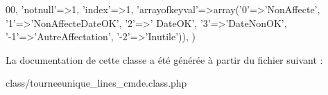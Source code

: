 \begin{DoxyCode}
      00, \textcolor{stringliteral}{'notnull'}=>1, \textcolor{stringliteral}{'index'}=>1, \textcolor{stringliteral}{'arrayofkeyval'}=>array(\textcolor{charliteral}{'0'}=>\textcolor{stringliteral}{'NonAffecte'}, \textcolor{charliteral}{'1'}=>\textcolor{stringliteral}{'NonAffecteDateOK'}, \textcolor{charliteral}{'2'}=>\textcolor{stringliteral}{'
      DateOK'}, \textcolor{charliteral}{'3'}=>\textcolor{stringliteral}{'DateNonOK'},  \textcolor{stringliteral}{'-1'}=>\textcolor{stringliteral}{'AutreAffectation'}, \textcolor{stringliteral}{'-2'}=>\textcolor{stringliteral}{'Inutile'})),
    )
\end{DoxyCode}


La documentation de cette classe a été générée à partir du fichier suivant \+:\begin{DoxyCompactItemize}
\item 
class/tourneeunique\+\_\+lines\+\_\+cmde.\+class.\+php\end{DoxyCompactItemize}
